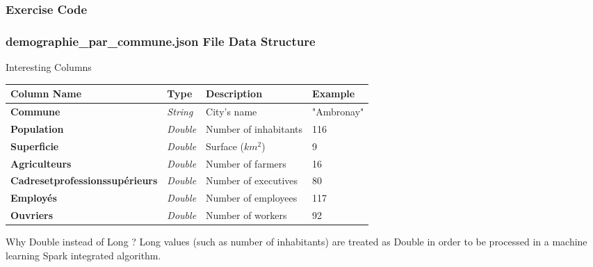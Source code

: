\documentclass[slidetop,9pt,utf8]{beamer}
\begin{document}
\begin{CJK}{UTF8}{gbsn}
\begin{frame}
\end{frame}

\begin{frame}
  \frametitle{Exercise Code}

  

\end{frame}

\begin{frame}

  \frametitle{demographie\_par\_commune.json File Data Structure}

  \begin{block}{Interesting Columns}
    \begin{tabular}{|l|l|l|l|}
          \hline 
          \rowcolor{gray} \textbf{Column Name} & \textbf{Type} & \textbf{Description} & \textbf{Example} \\ \hline
          \textbf{Commune} & \textit{String} & City's name & "Ambronay" \\ \hline
          \textbf{Population} & \textit{Double} & Number of inhabitants & 116 \\ \hline
          \textbf{Superficie} & \textit{Double} & Surface ($km^{2}$) & 9 \\ \hline
          \textbf{Agriculteurs} & \textit{Double} & Number of farmers & 16 \\ \hline
          \textbf{Cadresetprofessionssupérieurs} & \textit{Double} & Number of executives & 80 \\ \hline
          \textbf{Employés} & \textit{Double} & Number of employees & 117 \\ \hline
          \textbf{Ouvriers} & \textit{Double} & Number of workers & 92 \\ \hline
    \end{tabular}
  \end{block}

\begin{block}{Why Double instead of Long ?}
Long values (such as number of inhabitants) are treated as Double in order to be processed in a machine learning Spark integrated algorithm.
\end{block}

\end{frame}

\begin{frame}[fragile]


\end{frame}
\end{CJK}
\end{document}
